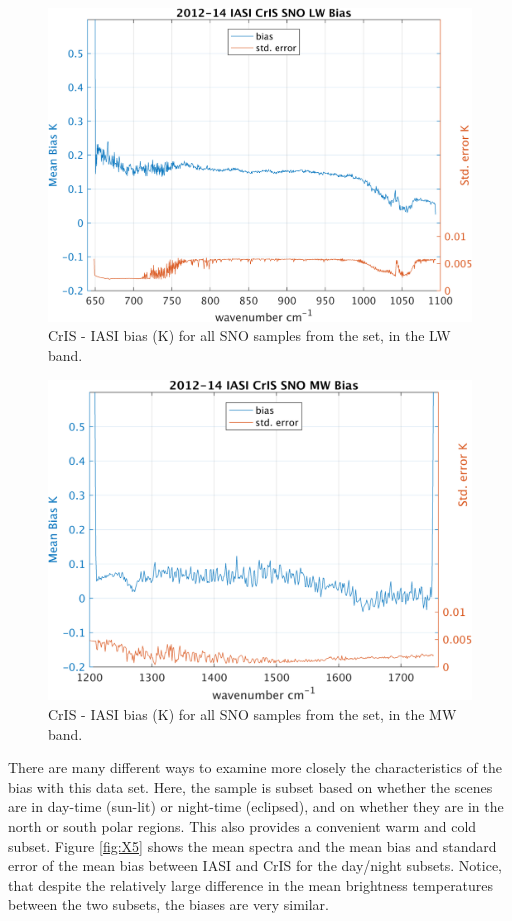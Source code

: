 \documentclass[11pt]{article}
\begin{document}
\begin{figure}[htb]
\centering
\includegraphics[width=.6\linewidth]{./figs/IC_jplSNO_Bias_stdErr_LW.png}
\caption{\label{fig:orgparagraph5}
  CrIS - IASI bias (K) for all SNO samples from the set, in the LW band.}
\label{fig:X3}
\end{figure}

\begin{figure}[htb]
\centering
\includegraphics[width=.6\linewidth]{./figs/IC_jplSNO_Bias_stdErr_MW.png}
\caption{\label{fig:orgparagraph5}
  CrIS - IASI bias (K) for all SNO samples from the set, in the MW band.}
\label{fig:X4}
\end{figure}

There are many different ways to examine more closely the characteristics of the bias with this data set. Here, the sample is subset based on whether the scenes are in day-time (sun-lit) or night-time (eclipsed), and on whether they are in the north or south polar regions. This also provides a convenient warm and cold subset. Figure \ref{fig:X5} shows the mean spectra and the mean bias and standard error of the mean bias between IASI and CrIS for the day/night subsets. Notice, that despite the
relatively large difference in the mean brightness temperatures between the two subsets, the biases are very similar.

\end{document}
